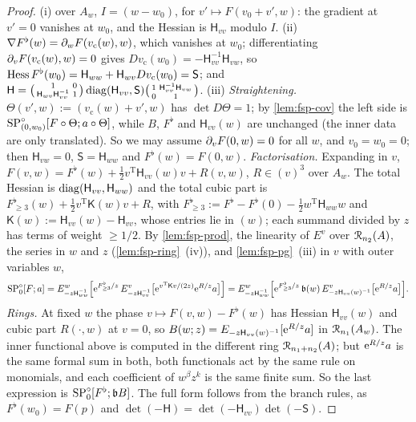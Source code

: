 \begin{proof}
(i)  over $A_w$, $I=(w-w_0)$, for $v'\mapsto F(v_0+v',w)$: the gradient at $v'=0$ vanishes at $w_0$, and the Hessian is $\mathsf H_{vv}$ modulo $I$.
(ii) $\nabla F^\flat(w)=\partial_wF(v_{\mathrm c}(w),w)$, which vanishes at $w_0$; differentiating $\partial_vF(v_{\mathrm c}(w),w)=0$ gives $Dv_{\mathrm c}(w_0)=-\mathsf H_{vv}^{-1}\mathsf H_{vw}$, so $\operatorname{Hess} F^\flat(w_0)=\mathsf H_{ww}+\mathsf H_{wv}Dv_{\mathrm c}(w_0)=\mathsf S$; and $\mathsf H=\bigl(\begin{smallmatrix}1&0\\ \mathsf H_{wv}\mathsf H_{vv}^{-1}&1\end{smallmatrix}\bigr)\operatorname{diag}(\mathsf H_{vv},\mathsf S)\bigl(\begin{smallmatrix}1&\mathsf H_{vv}^{-1}\mathsf H_{vw}\\0&1\end{smallmatrix}\bigr)$.
(iii) \emph{Straightening.} $\Theta(v',w):=(v_{\mathrm c}(w)+v',w)$ has $\det D\Theta=1$; by \cref{lem:fsp-cov} the left side is $\mathrm{SP}^{\circ}_{(0,w_0)}[F\circ\Theta;a\circ\Theta]$, while $B$, $F^\flat$ and $\mathsf H_{vv}(w)$ are unchanged (the inner data are only translated). So we may assume $\partial_vF(0,w)=0$ for all $w$, and $v_0=w_0=0$; then $\mathsf H_{vw}=0$, $\mathsf S=\mathsf H_{ww}$ and $F^\flat(w)=F(0,w)$.
\emph{Factorisation.} Expanding in $v$, $F(v,w)=F^\flat(w)+\frac12v^{\mathrm T}\mathsf H_{vv}(w)v+R(v,w)$, $R\in(v)^3$ over $A_w$. The total Hessian is $\operatorname{diag}(\mathsf H_{vv},\mathsf H_{ww})$ and the total cubic part is $F^\flat_{\geq3}(w)+\frac12v^{\mathrm T}\mathsf K(w)v+R$, with $F^\flat_{\geq3}:=F^\flat-F^\flat(0)-\frac12w^{\mathrm T}\mathsf H_{ww}w$ and $\mathsf K(w):=\mathsf H_{vv}(w)-\mathsf H_{vv}$, whose entries lie in $(w)$; each summand divided by $z$ has terms of weight $\geq1/2$. By \cref{lem:fsp-prod}, the linearity of $E^v$ over $\mathcal{R}_{n_2}(A)$, the series in $w$ and $z$ (\cref{lem:fsp-ring}~(iv)), and \cref{lem:fsp-pg}~(iii) in $v$ with outer variables $w$,
\[
\mathrm{SP}^{\circ}_0[F;a]=E^w_{-z\mathsf H_{ww}^{-1}}\Bigl[\mathrm{e}^{F^\flat_{\geq3}/z}\,E^v_{-z\mathsf H_{vv}^{-1}}\bigl[\mathrm{e}^{v^{\mathrm T}\mathsf Kv/(2z)}\mathrm{e}^{R/z}a\bigr]\Bigr]=E^w_{-z\mathsf H_{ww}^{-1}}\Bigl[\mathrm{e}^{F^\flat_{\geq3}/z}\,\mathfrak b(w)\,E^v_{-z\mathsf H_{vv}(w)^{-1}}\bigl[\mathrm{e}^{R/z}a\bigr]\Bigr].
\]
\emph{Rings.} At fixed $w$ the phase $v\mapsto F(v,w)-F^\flat(w)$ has Hessian $\mathsf H_{vv}(w)$ and cubic part $R(\cdot,w)$ at $v=0$, so $B(w;z)=E_{-z\mathsf H_{vv}(w)^{-1}}[\mathrm{e}^{R/z}a]$ in $\mathcal{R}_{n_1}(A_w)$. The inner functional above is computed in the different ring $\mathcal{R}_{n_1+n_2}(A)$; but $\mathrm{e}^{R/z}a$ is the same formal sum in both, both functionals act by the same rule on monomials, and each coefficient of $w^\beta z^k$ is the same finite sum. So the last expression is $\mathrm{SP}^{\circ}_0[F^\flat;\mathfrak bB]$. The full form follows from the branch rules, as $F^\flat(w_0)=F(p)$ and $\det(-\mathsf H)=\det(-\mathsf H_{vv})\det(-\mathsf S)$.
\end{proof}


